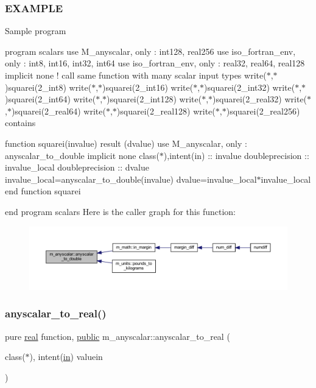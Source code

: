 \subsubsection*{E\+X\+A\+M\+P\+LE}

Sample program

program scalars use M\+\_\+anyscalar, only \+: int128, real256 use iso\+\_\+fortran\+\_\+env, only \+: int8, int16, int32, int64 use iso\+\_\+fortran\+\_\+env, only \+: real32, real64, real128 implicit none ! call same function with many scalar input types write($\ast$,$\ast$)squarei(2\+\_\+int8) write($\ast$,$\ast$)squarei(2\+\_\+int16) write($\ast$,$\ast$)squarei(2\+\_\+int32) write($\ast$,$\ast$)squarei(2\+\_\+int64) write($\ast$,$\ast$)squarei(2\+\_\+int128) write($\ast$,$\ast$)squarei(2\+\_\+real32) write($\ast$,$\ast$)squarei(2\+\_\+real64) write($\ast$,$\ast$)squarei(2\+\_\+real128) write($\ast$,$\ast$)squarei(2\+\_\+real256) contains

function squarei(invalue) result (dvalue) use M\+\_\+anyscalar, only \+: anyscalar\+\_\+to\+\_\+double implicit none class($\ast$),intent(in) \+:\+: invalue doubleprecision \+:\+: invalue\+\_\+local doubleprecision \+:\+: dvalue invalue\+\_\+local=anyscalar\+\_\+to\+\_\+double(invalue) dvalue=invalue\+\_\+local$\ast$invalue\+\_\+local end function squarei

end program scalars Here is the caller graph for this function\+:
\nopagebreak
\begin{figure}[H]
\begin{center}
\leavevmode
\includegraphics[width=350pt]{namespacem__anyscalar_a6173dbc57e7c5a96f5961d9e83e6e15e_icgraph}
\end{center}
\end{figure}
\mbox{\label{namespacem__anyscalar_a39cd9a778fff85974fa1a822b92555fd}} 
\subsubsection{\texorpdfstring{anyscalar\+\_\+to\+\_\+real()}{anyscalar\_to\_real()}}
{\footnotesize\ttfamily pure \hyperlink{read__watch_83_8txt_abdb62bde002f38ef75f810d3a905a823}{real} function, \hyperlink{M__stopwatch_83_8txt_a2f74811300c361e53b430611a7d1769f}{public} m\+\_\+anyscalar\+::anyscalar\+\_\+to\+\_\+real (\begin{DoxyParamCaption}\item[{class($\ast$), intent(\hyperlink{M__journal_83_8txt_afce72651d1eed785a2132bee863b2f38}{in})}]{valuein }\end{DoxyParamCaption})}




